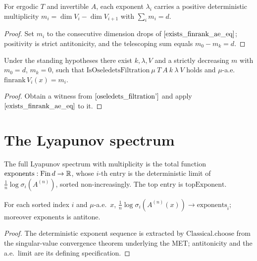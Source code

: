 \begin{corollary}\label{exists_multiplicity}
  \leanok
  For ergodic $T$ and invertible $A$, each exponent $\lambda_i$ carries a positive deterministic multiplicity $m_i = \dim V_i - \dim V_{i+1}$ with $\sum_i m_i = d$.
\end{corollary}
\begin{proof}\leanok
  Set $m_i$ to the consecutive dimension drops of $\ref{exists_finrank_ae_eq}$; positivity is strict antitonicity, and the telescoping sum equals $m_0 - m_k = d$.
\end{proof}

\begin{theorem}\label{oseledets_filtration_with_multiplicities}
  \leanok
  Under the standing hypotheses there exist $k, \lambda, V$ and a strictly decreasing $m$ with $m_0 = d$, $m_k = 0$, such that $\mathrm{IsOseledetsFiltration}\ \mu\ T\ A\ k\ \lambda\ V$ holds and $\mu$-a.e.\ $\mathrm{finrank}\,V_i(x) = m_i$.
\end{theorem}
\begin{proof}\leanok
  Obtain a witness from $\ref{oseledets_filtration'}$ and apply $\ref{exists_finrank_ae_eq}$ to it.
\end{proof}

\section{The Lyapunov spectrum}

\begin{definition}\label{exponents}
  \leanok
  The full Lyapunov spectrum with multiplicity is the total function $\mathrm{exponents} : \mathrm{Fin}\,d \to \mathbb{R}$, whose $i$-th entry is the deterministic limit of $\tfrac1n\log\sigma_i(A^{(n)})$, sorted non-increasingly. The top entry is $\mathrm{topExponent}$.
\end{definition}

\begin{theorem}\label{exponents_tendsto_log_singularValue}
  \leanok
  For each sorted index $i$ and $\mu$-a.e.\ $x$, $\tfrac1n\log\sigma_i(A^{(n)}(x)) \to \mathrm{exponents}_i$; moreover $\mathrm{exponents}$ is antitone.
\end{theorem}
\begin{proof}\leanok
  The deterministic exponent sequence is extracted by $\mathrm{Classical.choose}$ from the singular-value convergence theorem underlying the MET; antitonicity and the a.e.\ limit are its defining specification.
\end{proof}

